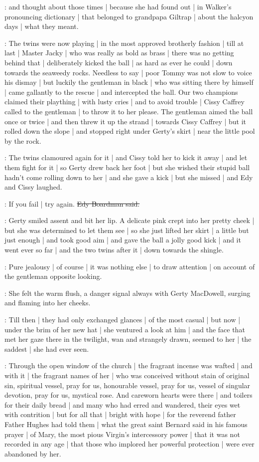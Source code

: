 \gertyReal:
and thought about those times |
because she had found out |
in Walker's pronouncing dictionary |
that belonged to grandpapa Giltrap |
about the halcyon days |
what they meant.

:
The twins were now playing |
in the most approved brotherly fashion |
till at last |
Master Jacky |
who was really as bold as brass |
there was no getting behind that |
deliberately kicked the ball |
as hard as ever he could |
down towards the seaweedy rocks.
Needless to say |
poor Tommy was not slow to voice his dismay |
but luckily the gentleman in black |
who was sitting there by himself |
came gallantly to the rescue |
and intercepted the ball.%
Our two champions
claimed their plaything |
with lusty cries |
and to avoid trouble |
Cissy Caffrey called to the gentleman |
to throw it to her please.
The gentleman aimed the ball
once or twice |
and then threw it up the strand |
towards Cissy Caffrey |
but it rolled down the slope |
and stopped right under Gerty's skirt |
near the little pool by the rock.

\gertyJudgy:
The twins clamoured again for it |
and Cissy told her to kick it away |
and let them fight for it |
so Gerty drew back her foot |
but she wished
their stupid ball hadn't come rolling down to her |
and she gave a kick |
but she missed |
and Edy and Cissy laughed.

\edy:
If you fail |
try again.
\sout{Edy Boardman said.}

\gertyReal:
Gerty smiled assent and bit her lip.%
A delicate pink
crept into her pretty cheek |
but she was determined to let them see |
so she just lifted her skirt |
a little but just enough |
and took good aim |
and gave the ball a jolly good kick |
and it went ever so far |
and the two twins after it |
down towards the shingle.

\gertyJudgy:
Pure jealousy |
of course |
it was nothing else |
to draw attention |
on account of the gentleman opposite looking.

\gertySex:
She felt the warm flush,
a danger signal always with Gerty MacDowell,
surging and flaming into her cheeks.

\gertyRomantic:
Till then |
they had only exchanged glances |
of the most casual |
but now |
under the brim of her new hat |
she ventured a look at him |
and the face that met her gaze there in the twilight,
wan and strangely drawn,
seemed to her |%
the saddest |
she had ever seen.

\Nrelig:
Through the open window of the church |
the fragrant incense was wafted |
and with it |
the fragrant names of her |
who was conceived without stain of original sin,
spiritual vessel,
pray for us,
honourable vessel,
pray for us,
vessel of singular devotion,
pray for us,
mystical rose.
And careworn hearts were there |
and toilers for their daily bread |
and many who had erred and wandered,
their eyes wet with contrition |
but for all that |
bright with hope |
for the reverend father Father Hughes
had told them |
what the great saint Bernard said in his famous prayer |
of Mary,
the most pious Virgin's intercessory power |
that it was not recorded in any age |
that those who implored her powerful protection |%
were ever abandoned by her.

